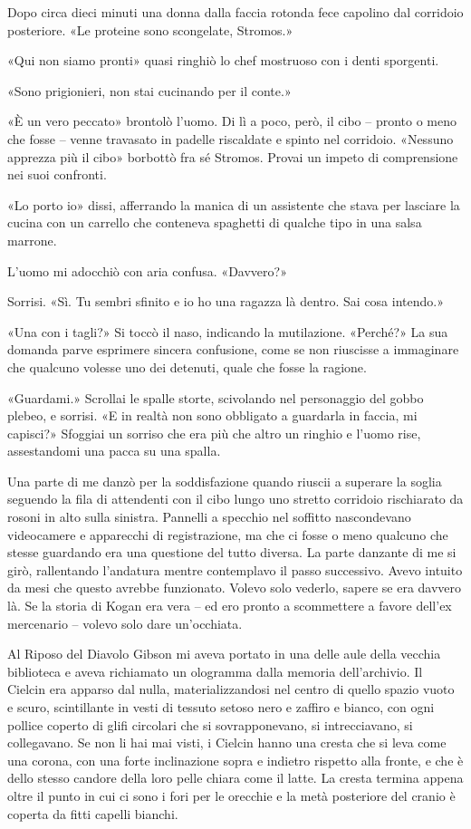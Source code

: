 Dopo circa dieci minuti una donna dalla faccia rotonda fece capolino dal
corridoio posteriore. «Le proteine sono scongelate, Stromos.»

«Qui non siamo pronti» quasi ringhiò lo chef mostruoso con i denti
sporgenti.

«Sono prigionieri, non stai cucinando per il conte.»

«È un vero peccato» brontolò l'uomo. Di lì a poco, però, il cibo --
pronto o meno che fosse -- venne travasato in padelle riscaldate e
spinto nel corridoio. «Nessuno apprezza più il cibo» borbottò fra sé
Stromos. Provai un impeto di comprensione nei suoi confronti.

«Lo porto io» dissi, afferrando la manica di un assistente che stava per
lasciare la cucina con un carrello che conteneva spaghetti di qualche
tipo in una salsa marrone.

L'uomo mi adocchiò con aria confusa. «Davvero?»

Sorrisi. «Sì. Tu sembri sfinito e io ho una ragazza là dentro. Sai cosa
intendo.»

«Una con i tagli?» Si toccò il naso, indicando la mutilazione. «Perché?»
La sua domanda parve esprimere sincera confusione, come se non riuscisse
a immaginare che qualcuno volesse uno dei detenuti, quale che fosse la
ragione.

«Guardami.» Scrollai le spalle storte, scivolando nel personaggio del
gobbo plebeo, e sorrisi. «E in realtà non sono obbligato a guardarla in
faccia, mi capisci?» Sfoggiai un sorriso che era più che altro un
ringhio e l'uomo rise, assestandomi una pacca su una spalla.

Una parte di me danzò per la soddisfazione quando riuscii a superare la
soglia seguendo la fila di attendenti con il cibo lungo uno stretto
corridoio rischiarato da rosoni in alto sulla sinistra. Pannelli a
specchio nel soffitto nascondevano videocamere e apparecchi di
registrazione, ma che ci fosse o meno qualcuno che stesse guardando era
una questione del tutto diversa. La parte danzante di me si girò,
rallentando l'andatura mentre contemplavo il passo successivo. Avevo
intuito da mesi che questo avrebbe funzionato. Volevo solo vederlo,
sapere se era davvero là. Se la storia di Kogan era vera -- ed ero
pronto a scommettere a favore dell'ex mercenario -- volevo solo dare
un'occhiata.

Al Riposo del Diavolo Gibson mi aveva portato in una delle aule della
vecchia biblioteca e aveva richiamato un ologramma dalla memoria
dell'archivio. Il Cielcin era apparso dal nulla, materializzandosi nel
centro di quello spazio vuoto e scuro, scintillante in vesti di tessuto
setoso nero e zaffiro e bianco, con ogni pollice coperto di glifi
circolari che si sovrapponevano, si intrecciavano, si collegavano. Se
non li hai mai visti, i Cielcin hanno una cresta che si leva come una
corona, con una forte inclinazione sopra e indietro rispetto alla
fronte, e che è dello stesso candore della loro pelle chiara come il
latte. La cresta termina appena oltre il punto in cui ci sono i fori per
le orecchie e la metà posteriore del cranio è coperta da fitti capelli
bianchi.

